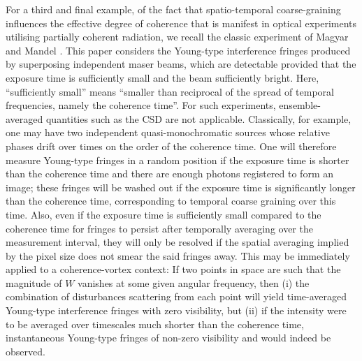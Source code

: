 \documentclass[%
 reprint,
 amsmath,amssymb,
 aps,
]{revtex4-1}
\begin{document}
For a third and final example, of the fact that spatio-temporal coarse-graining influences the effective degree of coherence that is manifest in optical experiments utilising partially coherent radiation, we recall the classic experiment of Magyar and Mandel \cite{MagyarMandel1963}.  This paper considers the Young-type interference fringes produced by superposing independent maser beams, which are detectable provided that the exposure time is sufficiently small and the beam sufficiently bright.  Here, ``sufficiently small'' means ``smaller than reciprocal of the spread of temporal frequencies, namely the coherence time''.  For such experiments, ensemble-averaged quantities such as the CSD are not applicable.  Classically, for example, one may have two independent quasi-monochromatic sources whose relative phases drift over times on the order of the coherence time.  One will therefore measure Young-type fringes in a random position if the exposure time is shorter than the coherence time and there are enough photons registered to form an image; these fringes will be washed out if the exposure time is significantly longer than the coherence time, corresponding to temporal coarse graining over this time.  Also, even if the exposure time is sufficiently small compared to the coherence time for fringes to persist after temporally averaging over the measurement interval, they will only be resolved if the spatial averaging implied by the pixel size does not smear the said fringes away.  This may be immediately applied to a coherence-vortex context: If two points in space are such that the magnitude of $W$ vanishes at some given angular frequency, then (i) the combination of disturbances scattering from each point will yield time-averaged Young-type interference fringes with zero visibility, but (ii) if the intensity were to be averaged over timescales much shorter than the coherence time, instantaneous Young-type fringes of non-zero visibility and would indeed be observed.   
\end{document}
